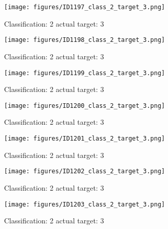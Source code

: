 \begin{figure}[h!]
\begin{center}
\texttt{[image: figures/ID1197\_class\_2\_target\_3.png]}
\end{center}
\caption{ Classification: 2 actual target: 3}
\label{fig:ID1197_class_2_target_3}
\end{figure}
\begin{figure}[h!]
\begin{center}
\texttt{[image: figures/ID1198\_class\_2\_target\_3.png]}
\end{center}
\caption{ Classification: 2 actual target: 3}
\label{fig:ID1198_class_2_target_3}
\end{figure}
\begin{figure}[h!]
\begin{center}
\texttt{[image: figures/ID1199\_class\_2\_target\_3.png]}
\end{center}
\caption{ Classification: 2 actual target: 3}
\label{fig:ID1199_class_2_target_3}
\end{figure}
\begin{figure}[h!]
\begin{center}
\texttt{[image: figures/ID1200\_class\_2\_target\_3.png]}
\end{center}
\caption{ Classification: 2 actual target: 3}
\label{fig:ID1200_class_2_target_3}
\end{figure}
\begin{figure}[h!]
\begin{center}
\texttt{[image: figures/ID1201\_class\_2\_target\_3.png]}
\end{center}
\caption{ Classification: 2 actual target: 3}
\label{fig:ID1201_class_2_target_3}
\end{figure}
\begin{figure}[h!]
\begin{center}
\texttt{[image: figures/ID1202\_class\_2\_target\_3.png]}
\end{center}
\caption{ Classification: 2 actual target: 3}
\label{fig:ID1202_class_2_target_3}
\end{figure}
\begin{figure}[h!]
\begin{center}
\texttt{[image: figures/ID1203\_class\_2\_target\_3.png]}
\end{center}
\caption{ Classification: 2 actual target: 3}
\label{fig:ID1203_class_2_target_3}
\end{figure}
